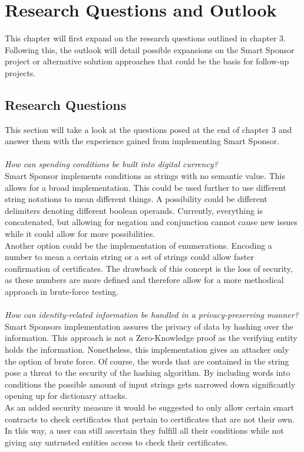 \chapter{Research Questions and Outlook}
This chapter will first expand on the research questions outlined in chapter 3. Following this, the outlook will detail possible expansions on the Smart Sponsor project or alternative solution approaches that could be the basis for follow-up projects.
\section{Research Questions}
This section will take a look at the questions posed at the end of chapter 3 and answer them with the experience gained from implementing Smart Sponsor.\\
\\
\emph{How can spending conditions be built into digital currency?}\\
Smart Sponsor implements conditions as strings with no semantic value. This allows for a broad implementation. This could be used further to use different string notations to mean different things. A possibility could be different delimiters denoting different boolean operands. Currently, everything is concatenated, but allowing for negation and conjunction cannot cause new issues while it could allow for more possibilities.\\
Another option could be the implementation of enumerations. Encoding a number to mean a certain string or a set of strings could allow faster confirmation of certificates. The drawback of this concept is the loss of security, as these numbers are more defined and therefore allow for a more methodical approach in brute-force testing.\\
\\
\emph{How can identity-related information be handled in a privacy-preserving manner?}\\
Smart Sponsors implementation assures the privacy of data by hashing over the information. This approach is not a Zero-Knowledge proof as the verifying entity holds the information. Nonetheless, this implementation gives an attacker only the option of brute force. Of course, the words that are contained in the string pose a threat to the security of the hashing algorithm. By including words into conditions the possible amount of input strings gets narrowed down significantly opening up for dictionary attacks.\\
As an added security measure it would be suggested to only allow certain smart contracts to check certificates that pertain to certificates that are not their own. In this way, a user can still ascertain they fulfill all their conditions while not giving any untrusted entities access to check their certificates.\\

